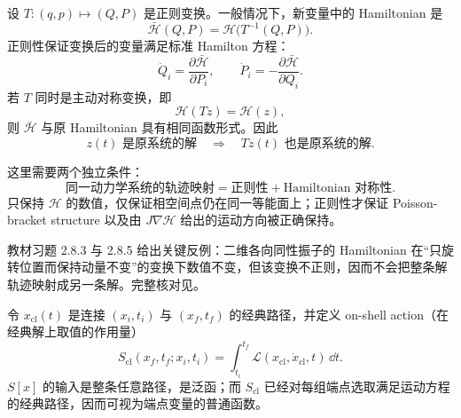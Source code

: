 
设 $T:(q,p)\mapsto(Q,P)$ 是正则变换。一般情况下，新变量中的 Hamiltonian 是
\begin{equation}
  \bar{\mathcal H}(Q,P)
  =\mathcal H\bigl(T^{-1}(Q,P)\bigr).
  \label{eq:QM-C02-S08-transformed-hamiltonian}
\end{equation}
正则性保证变换后的变量满足标准 Hamilton 方程：
\[
  \dot Q_i=\frac{\partial\bar{\mathcal H}}{\partial P_i},
  \qquad
  \dot P_i=-\frac{\partial\bar{\mathcal H}}{\partial Q_i}.
\]
若 $T$ 同时是主动对称变换，即
\begin{equation}
  \mathcal H(Tz)=\mathcal H(z),
  \label{eq:QM-C02-S08-active-symmetry}
\end{equation}
则 $\bar{\mathcal H}$ 与原 Hamiltonian 具有相同函数形式。因此
\begin{equation}
  \boxed{
  z(t)\text{ 是原系统的解}
  \quad\Longrightarrow\quad
  Tz(t)\text{ 也是原系统的解}.}
  \label{eq:QM-C02-S08-symmetry-maps-solutions}
\end{equation}

这里需要两个独立条件：
\begin{equation}
  \boxed{
  \text{同一动力学系统的轨迹映射}
  =\text{正则性}+\text{Hamiltonian 对称性}.}
  \label{eq:QM-C02-S08-two-requirements}
\end{equation}
只保持 $\mathcal H$ 的数值，仅保证相空间点仍在同一等能面上；正则性才保证 Poisson-bracket structure 以及由 $J\nabla\mathcal H$ 给出的运动方向被正确保持。

教材习题 2.8.3 与 2.8.5 给出关键反例：二维各向同性振子的 Hamiltonian 在“只旋转位置而保持动量不变”的变换下数值不变，但该变换不正则，因而不会把整条解轨迹映射成另一条解。完整核对见。


令 $x_{\mathrm{cl}}(t)$ 是连接 $(x_i,t_i)$ 与 $(x_f,t_f)$ 的经典路径，并定义 on-shell action（在经典解上取值的作用量）
\begin{equation}
  S_{\mathrm{cl}}(x_f,t_f;x_i,t_i)
  =\int_{t_i}^{t_f}
    \mathcal L(x_{\mathrm{cl}},\dot x_{\mathrm{cl}},t)\,\dd t.
  \label{eq:QM-C02-S08-classical-action}
\end{equation}
$S[x]$ 的输入是整条任意路径，是泛函；而 $S_{\mathrm{cl}}$ 已经对每组端点选取满足运动方程的经典路径，因而可视为端点变量的普通函数。

